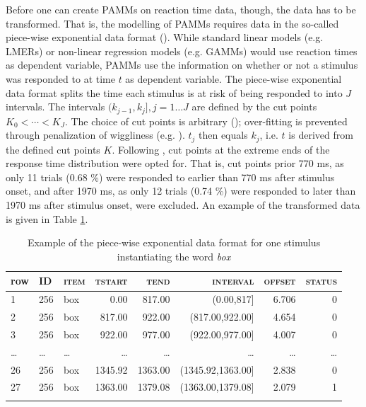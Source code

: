 Before one can create PAMMs on reaction time data, though, the data has to be transformed. That is, the modelling of PAMMs requires data in the so-called piece-wise exponential data format (\cite{Bender2018a}). While standard linear models (e.g. LMERs) or non-linear regression models (e.g. GAMMs) would use reaction times as dependent variable, PAMMs use the information on whether or not a stimulus was responded to at time $t$ as dependent variable. The piece-wise exponential data format splits the time each stimulus is at risk of being responded to into $J$ intervals. The intervals $(k_{j-1},k_j ],j=1…J$ are defined by the cut points $K_0<⋯<K_J$. The choice of cut points is arbitrary (\cite{Hendrix2020}); over-fitting is prevented through penalization of wiggliness (e.g. \cite{Wood2017}). $t_j$ then equals $k_j$, i.e. $t$ is derived from the defined cut points $K$. Following \citet{Hendrix2020}, cut points at the extreme ends of the response time distribution were opted for. That is, cut points prior 770 ms, as only 11 trials (0.68 \%) were responded to earlier than 770 ms after stimulus onset, and after 1970 ms, as only 12 trials (0.74 \%) were responded to later than 1970 ms after stimulus onset, were excluded. An example of the transformed data is given in Table \ref{tab:7.4}.

\begin{table}\fontsize{10}{11}
\caption{Example of the piece-wise exponential data format for one stimulus instantiating the word \textit{box}}
\label{tab:7.4}
\centering
\begin{tabular}{lllrrrrr} 
\lsptoprule
row & \textsc{ID}  & \textsc{item} & \textsc{tstart}  & \textsc{tend}    & \textsc{interval}          & \textsc{offset} & \textsc{status}  \\ 
\midrule
1   & 256 & box  & 0.00    & 817.00  & (0.00,817]        & 6.706  & 0       \\
2   & 256 & box  & 817.00  & 922.00  & (817.00,922.00]   & 4.654  & 0       \\
3   & 256 & box  & 922.00  & 977.00  & (922.00,977.00]   & 4.007  & 0       \\
…   & …   & …    & …       & …       & …                 & …      & …       \\
26  & 256 & box  & 1345.92 & 1363.00 & (1345.92,1363.00] & 2.838  & 0       \\
27  & 256 & box  & 1363.00 & 1379.08 & (1363.00,1379.08] & 2.079  & 1       \\
\lspbottomrule
\end{tabular}
\end{table}

